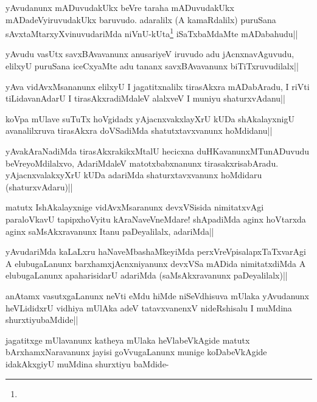 

\begin{artha}
yAvudanunx mADuvudakUkx beVre taraha mADuvudakUkx mADadeVyiruvudakUkx baruvudo. adaralilx (A kamaRdalilx) puruSana sAvxtaMtarxyXvinuvudariMda niVnU-kUta\footnote[1]{} iSaTxbaMdaMte mADabahudu||
\end{artha}

\begin{artha}
yAvudu vasUtx savxBAvavanunx anusariyeV iruvudo adu jAcnxnavAguvudu, elilxyU puruSana iceCxyaMte adu tananx savxBAvavanunx biTiTxruvudilalx||
\end{artha}

\begin{artha}
yAva vidAvxMsananunx elilxyU I jagatitxnalilx tirasAkxra mADabAradu, I riVti tiLidavanAdarU I tirasAkxradiMdaleV alalxveV I muniyu shaturxvAdanu||
\end{artha}

\begin{artha}
koVpa mUlave suTuTx hoVgidadx yAjacnxvakxlayXrU kUDa shAkalayxnigU avanalilxruva tirasAkxra doVSadiMda shatutxtavxvanunx hoMdidanu|| 
\end{artha}%

\begin{artha}
yAvakAraNadiMda tirasAkxrakikxMtalU hecicxna duHKavanunxMTunADuvudu beVreyoMdilalxvo, AdariMdaleV matotxbabxnanunx tirasakxrisabAradu. yAjacnxvalakxyXrU kUDa adariMda shaturxtavxvanunx hoMdidaru (shaturxvAdaru)||
\end{artha}

\begin{artha}
matutx IshAkalayxnige vidAvxMsaranunx devxVSisida nimitatxvAgi paraloVkavU tapipxhoVyitu kAraNaveVneMdare! shApadiMda aginx hoVtarxda aginx saMsAkxravanunx Itanu paDeyalilalx, adariMda||
\end{artha}

\begin{artha}
yAvudariMda kaLaLxru haNaveMbashaMkeyiMda perxVreVpisalapxTaTxvarAgi A elubugaLanunx barxhamxjAcnxniyanunx devxVSa mADida nimitatxdiMda A elubugaLanunx apaharisidarU adariMda (saMsAkxravanunx paDeyalilalx)||
\end{artha}

\begin{artha}%
anAtamx vasutxgaLanunx neVti eMdu hiMde niSeVdhisuva mUlaka yAvudanunx heVLididxrU vidhiya mUlAka adeV tatavxvanenxV nideRshisalu I muMdina shurxtiyubaMdide||

jagatitxge mUlavanunx katheya mUlaka heVlabeVkAgide matutx bArxhamxNaravanunx jayisi goVvugaLanunx munige koDabeVkAgide idakAkxgiyU muMdina shurxtiyu baMdide-
\end{artha}

